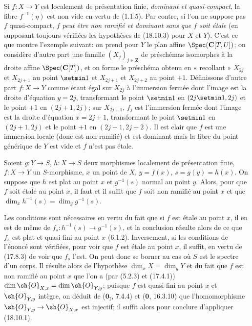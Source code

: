 
\begin{remark}[18.10.3.1]
\label{IV.18.10.3.1}
Si $f:X\to Y$ est localement de présentation finie, \emph{dominant et quasi-compact}, la fibre $f^{-1}(\eta)$ est non vide en vertu de (1.1.5). Par contre, si l'on ne suppose pas $f$ quasi-compact, \emph{$f$ peut être non ramifié et dominant sans que $f$ soit étale} (en supposant toujours vérifiées les hypothèses de (18.10.3) pour $X$ et $Y$). C'est ce que montre l'exemple suivant: on prend pour $Y$ le plan affine $\Spec(\mathbf C[T,U])$; on considère d'autre part une famille $(X_j)_{j\in\mathbf Z}$ de préschémas isomorphes à la droite affine $\Spec(\mathbf C[T])$, et on forme le préschéma obtenu en « recollant » $X_{2j}$ et $X_{2j+1}$ au point $\setmin 1$ et $X_{2j+1}$ et $X_{2j+2}$ au point $+1$. Définissons d'autre part $f:X\to Y$ comme étant égal sur $X_{2j}$ à l'immersion fermée dont l'image est la droite d'équation $y=2j$, transformant le point $\setmin 1$ en $(2j\setmin 1,2j)$ et le point $+1$ en $(2j+1,2j)$; sur $X_{2j+1}$, $f_j$ est l'immersion fermée dont l'image est la droite d'équation $x=2j+1$, transformant le point $\setmin 1$ en $(2j+1,2j)$ et le point $+1$ en $(2j+1,2j+2)$. Il est clair que $f$ est une immersion locale (donc est non ramifié) et est dominant mais la fibre du point générique de $Y$ est vide et $f$ n'est pas étale.
\end{remark}

\begin{corollary}[18.10.4]
\label{IV.18.10.4}
Soient $g:Y\to S$, $h:X\to S$ deux morphismes localement de présentation finie, $f:X\to Y$ un $S$-morphisme, $x$ un point de $X$, $y=f(x)$, $s=g(y)=h(x)$. On suppose que $h$ est \textup{plat} au point $x$ et $g^{-1}(s)$ \textup{normal} au point $y$. Alors, pour que $f$ soit étale au point $x$, il faut et il suffit que $f$ soit non ramifié au point $x$ et que $\dim_xh^{-1}(s)=\dim_yg^{-1}(s)$.
\end{corollary}

Les conditions sont nécessaires en vertu du fait que si $f$ est étale au point $x$, il en est de même de $f_s:h^{-1}(s)\to g^{-1}(s)$, et la conclusion résulte alors de ce que $f_s$ est plat et quasi-fini au point $x$ (6.1.2). Inversement, si les conditions de l'énoncé sont vérifiées, pour voir que $f$ est étale au point $x$, il suffit, en vertu de (17.8.3) de voir que $f_s$ l'est. On peut donc se borner au cas où $S$ est le spectre d'un corps. Il résulte alors de l'hypothèse $\dim_xX=\dim_yY$ et du fait que $f$ est non ramifié au point $x$ que l'on a (par (5.2.3) et (17.4.1)) $\dim\sh{O}_{X,x}=\dim\sh{O}_{Y,y}$; puisque $f$ est quasi-fini au point $x$ et $\sh{O}_{Y,y}$ intègre, on déduit de ($\mathbf{0}_{\mathrm I}$, 7.4.4) et ($\mathbf{0}$, 16.3.10) que l'homomorphisme $\sh{O}_{Y,y}\to\sh{O}_{X,x}$ est injectif; il suffit alors pour conclure d'appliquer (18.10.1).

